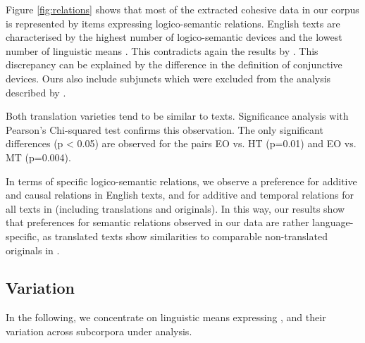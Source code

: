 \documentclass[output=paper]{langsci/langscibook.cls}
\begin{document}
Figure \ref{fig:relations} shows that most of the extracted cohesive data in our corpus is represented by items expressing logico-semantic relations. %
English texts are characterised by the highest number of logico-semantic devices and the lowest number of linguistic means . This contradicts again the results by \citep[25]{SleGeccoForthcoming}. This discrepancy can be explained by the difference in the definition of conjunctive devices. Ours also include subjuncts which were excluded from the analysis described by \citep{SleGeccoForthcoming}. %

Both translation varieties tend to be similar to  texts. Significance analysis with Pearson's Chi-squared test confirms this observation. The only significant differences (p < 0.05) are observed for the pairs EO vs. HT (p=0.01) and EO vs. MT (p=0.004).


In terms of specific logico-semantic relations, we observe a preference for additive and causal relations in English texts, and for additive and temporal relations for all texts in  (including translations and originals). %
In this way, our results show that preferences for semantic relations observed in our data are rather language-specific, as translated texts show similarities to comparable non-translated originals in .


\subsection{Variation}

In the following, we concentrate on linguistic means expressing , and their variation across subcorpora under analysis.
\end{document}
